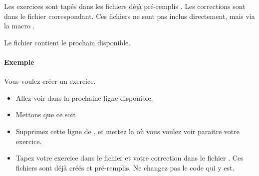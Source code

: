 \vspace{1cm}

Les exercices sont tapés dans les fichiers déjà pré-remplis . Les corrections sont dans le fichier  correspondant. Ces fichiers ne sont pas inclus directement, mais via la macro .

Le fichier  contient le prochain disponible.

\paragraph{Exemple}

Vous voulez créer un exercice.
\begin{itemize}
    \item Allez voir dans  la prochaine ligne  disponible.
    \item Mettons que ce soit   
    \item Supprimez cette ligne de , et mettez la où vous voulez voir paraitre votre exercice.
    \item Tapez votre exercice dans le fichier  et votre correction dans le fichier . Ces fichiers sont déjà créés et pré-remplis. Ne changez pas le code qui y est.
\end{itemize}




